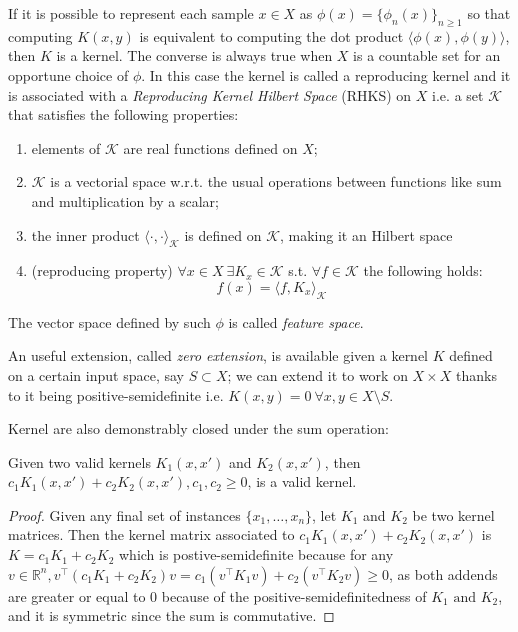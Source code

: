 If it is possible to represent each sample $x \in X$ as $\phi(x) = \{\phi_n(x)\}_{n \geq 1}$
so that computing $K(x,y)$ is equivalent to computing the dot product $\langle
\phi(x),\phi(y)\rangle$, then $K$ is a kernel.
The converse is always true when $X$ is a countable set for an opportune choice
of $\phi$.
In this case the kernel is called a reproducing kernel and it is associated with a \emph{Reproducing
    Kernel Hilbert Space} (RHKS) on $X$ i.e. a set $\mathcal{K}$ that satisfies the following properties:
\begin{enumerate}
    \item elements of $\mathcal{K}$ are real functions defined on $X$;
    \item $\mathcal{K}$ is a vectorial space w.r.t. the usual operations between
    functions like sum and multiplication by a scalar;
    \item the inner product $\langle\cdot,\cdot\rangle_\mathcal{K}$ is 
        defined on $\mathcal{K}$, making it an Hilbert space
    \item (reproducing property) $\forall x \in X~\exists K_x \in \mathcal{K}$
        s.t. $\forall f \in \mathcal{K}$ the following holds:
        \[ f(x) = \langle f,K_x\rangle_\mathcal{K} \]
\end{enumerate}
The vector space defined by such $\phi$ is called \emph{feature space}.

An useful extension, called \emph{zero extension}, is available given a kernel $K$
defined on a certain input space, say $S\subset X$; we can extend it to work
on $X\times X$ thanks to it being positive-semidefinite i.e.
$K(x,y)=0~\forall x,y \in X\setminus S$.

Kernel are also demonstrably closed under the sum operation:
\begin{theorem}
    Given two valid kernels $K_1(x,x')$ and $K_2(x,x')$, then $c_1K_1(x,x') +
    c_2K_2(x,x'), c_1,c_2 \geq 0$, is a valid kernel.
\end{theorem}
\begin{proof}
    Given any final set of instances $\{x_1,\dots,x_n\}$, let $K_1$ and $K_2$ be
    two kernel matrices. Then the kernel matrix
    associated to $c_1K_1(x,x') + c_2K_2(x,x')$ is $K=c_1K_1+c_2K_2$ which is
    postive-semidefinite because for any $v\in\mathbb{R}^n, v^\top(c_1K_1+c_2K_2)v
    = c_1(v^\top K_1v)+c_2(v^\top K_2v) \geq 0$, as both addends are greater or
    equal to 0 because of the positive-semidefinitedness of $K_1\text{ and }K_2$,
    and it is symmetric since the sum is commutative.
\end{proof}

